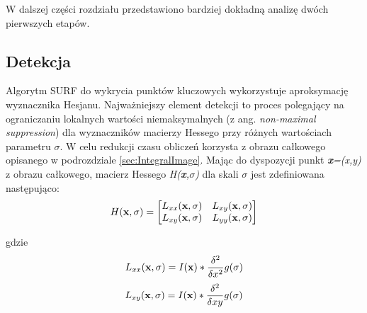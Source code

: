 W dalszej części rozdziału przedstawiono bardziej dokładną analizę dwóch pierwszych etapów.

\subsection{Detekcja}
Algorytm SURF do wykrycia punktów kluczowych wykorzystuje aproksymację wyznacznika Hesjanu. Najważniejszy element detekcji to proces polegający na ograniczaniu lokalnych wartości niemaksymalnych (z ang. \textit{non-maximal suppression}) dla wyznaczników macierzy Hessego przy różnych wartościach parametru $\sigma$. W celu redukcji czasu obliczeń korzysta z obrazu całkowego opisanego w podrozdziale \ref{sec:IntegralImage}.
Mając do dyspozycji punkt \textit{\textbf{x}=(x,y)} z obrazu całkowego, macierz Hessego \textit{H(\textbf{x},$\sigma$)} dla skali $\sigma$ jest zdefiniowana następująco:
\begin{equation}\textsl{}
H(\textbf{x},\sigma) = 
\begin{bmatrix}
L_{xx}(\textbf{x},\sigma) & L_{xy}(\textbf{x},\sigma) \\ L_{xy}(\textbf{x},\sigma) & L_{yy}(\textbf{x},\sigma)
\end{bmatrix}
\end{equation}

gdzie 
\begin{equation}\textsl{}
L_{xx}(\textbf{x},\sigma) = I(\textbf{x})*\frac{\delta^2}{\delta x^2}g(\sigma)
\end{equation}
\begin{equation}\textsl{}
L_{xy}(\textbf{x},\sigma) = I(\textbf{x})*\frac{\delta^2}{\delta xy}g(\sigma)
\end{equation}

